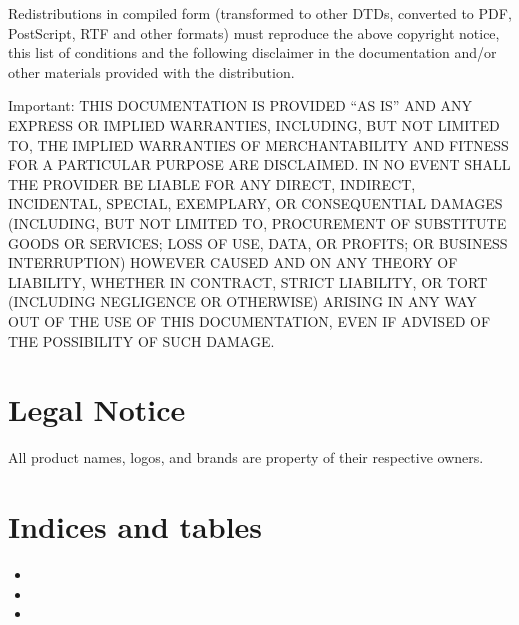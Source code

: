 \documentclass[letterpaper,10pt,english]{sphinxmanual}
\begin{document}
Redistributions in compiled form (transformed to other DTDs, converted to PDF, PostScript, RTF and other formats) must reproduce the above copyright notice, this list of conditions and the following disclaimer in the documentation and/or other materials provided with the distribution.

Important: THIS DOCUMENTATION IS PROVIDED “AS IS” AND ANY EXPRESS OR IMPLIED WARRANTIES, INCLUDING, BUT NOT LIMITED TO, THE IMPLIED WARRANTIES OF MERCHANTABILITY AND FITNESS FOR A PARTICULAR PURPOSE ARE DISCLAIMED. IN NO EVENT SHALL THE PROVIDER BE LIABLE FOR ANY DIRECT, INDIRECT, INCIDENTAL, SPECIAL, EXEMPLARY, OR CONSEQUENTIAL DAMAGES (INCLUDING, BUT NOT LIMITED TO, PROCUREMENT OF SUBSTITUTE GOODS OR SERVICES; LOSS OF USE, DATA, OR PROFITS; OR BUSINESS INTERRUPTION) HOWEVER CAUSED AND ON ANY THEORY OF LIABILITY, WHETHER IN CONTRACT, STRICT LIABILITY, OR TORT (INCLUDING NEGLIGENCE OR OTHERWISE) ARISING IN ANY WAY OUT OF THE USE OF THIS DOCUMENTATION, EVEN IF ADVISED OF THE POSSIBILITY OF SUCH DAMAGE.


\chapter{Legal Notice}
\label{\detokenize{legalnotice:legal-notice}}\label{\detokenize{legalnotice::doc}}
All product names, logos, and brands are property of their respective owners.


\chapter{Indices and tables}
\label{\detokenize{index:indices-and-tables}}\begin{itemize}
\item {} 

\item {} 

\item {} 

\end{itemize}



\renewcommand{\indexname}{Index}
\printindex
\end{document}
